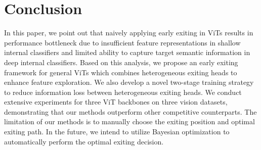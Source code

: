 \section{Conclusion}
\label{sc:conclusion}

In this paper, we point out that naively applying early exiting in ViTs results in performance bottleneck due to insufficient feature representations in shallow internal classifiers and limited ability to capture target semantic information in deep internal classifiers. 
Based on this analysis, we propose an early exiting framework for general ViTs which combines heterogeneous exiting heads to enhance feature exploration. 
We also develop a novel two-stage training strategy to reduce information loss between heterogeneous exiting heads. 
We conduct extensive experiments for three ViT backbones on three vision datasets, 
demonstrating that our methods outperform other competitive counterparts. 
The limitation of our methods is to manually choose the exiting position and optimal exiting path. 
In the future, we intend to utilize Bayesian optimization to automatically perform the optimal exiting decision. 
